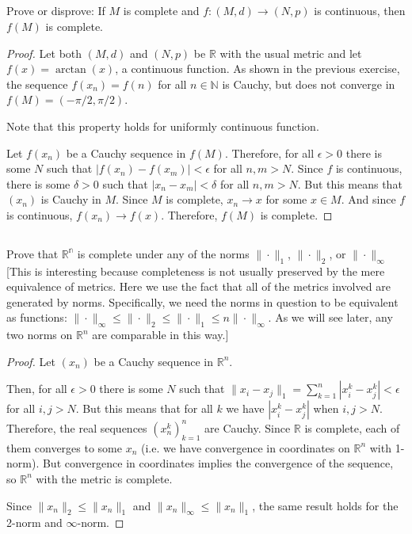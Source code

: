 \subsection{} Prove or disprove:  If $M$ is complete and $f: (M, d) \rightarrow (N, p)$ is continuous, then $f(M)$ is complete. 

\begin{proof}
Let both $(M,d)$ and $(N,p)$ be $\mathbb{R}$ with the usual metric and let $f(x) = \arctan(x)$, a continuous function. As shown in the previous exercise, the sequence $f(x_n) = f(n)$ for all $n \in \mathbb{N}$ is Cauchy, but does not converge in $f(M) = (-\pi/2, \pi/2)$.

Note that this property holds for uniformly continuous function.

Let $f(x_n)$ be a Cauchy sequence in $f(M)$. Therefore, for all $\epsilon > 0$ there is some $N$ such that $|f(x_n) - f(x_m)| < \epsilon$ for all $n,m > N$. Since $f$ is continuous, there is some $\delta > 0$ such that $|x_n - x_m| < \delta$ for all $n,m>N$. But this means that $(x_n)$ is Cauchy in $M$. Since $M$ is complete, $x_n \rightarrow x$ for some $x \in M$. And since $f$ is continuous, $f(x_n) \rightarrow f(x)$. Therefore, $f(M)$ is complete.

\end{proof}

\subsection{} Prove that $\mathbb{R^n}$ is complete under any of the norms $\|\cdot\|_1$, $\|\cdot\|_2$, or $\|\cdot\|_\infty$ [This is interesting because completeness is not usually preserved by the mere equivalence of metrics.  Here we use  the fact that all of the metrics involved are generated by norms. Specifically, we need the norms in question to be equivalent as functions: $\|\cdot\|_\infty \leq \|\cdot\|_2 \leq \|\cdot\|_1 \leq n\|\cdot\|_\infty$. As we will see later, any two norms on $\mathbb{R}^n$ are comparable in this way.] 

\begin{proof}
Let $(x_n)$ be a Cauchy sequence in $\mathbb{R}^n$.

Then, for all $\epsilon > 0$ there is some $N$ such that $\|x_i - x_j\|_1 = \sum_{k=1}^n |x_i^k - x_j^k| < \epsilon$ for all $i, j > N$. But this means that for all $k$ we have $|x_i^k - x_j^k|$ when $i,j > N$. Therefore, the real sequences $(x_n^k)_{k=1}^n$ are Cauchy. Since $\mathbb{R}$ is complete, each of them converges to some $x_n$ (i.e. we have convergence in coordinates on $\mathbb{R}^n$ with 1-norm). But convergence in coordinates implies the convergence of the sequence, so $\mathbb{R}^n$ with the metric is complete.

Since $\|x_n\|_2 \leq \|x_n\|_1$ and $\|x_n\|_\infty \leq \|x_n\|_1$, the same result holds for the 2-norm and $\infty$-norm. 
\end{proof}

